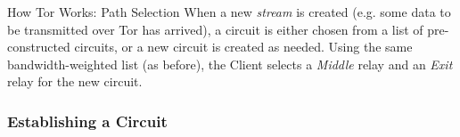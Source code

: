 \documentclass[9pt,a4paper,handout]{beamer}
\begin{document}
\begin{frame}{How Tor Works: Path Selection}
  When a new \emph{stream} is created (e.g. some data to be transmitted over Tor has arrived), a
  circuit is either chosen from a list of pre-constructed circuits, or a new circuit is created as
  needed. Using the same bandwidth-weighted list (as before), the Client selects a \emph{Middle}
  relay and an \emph{Exit} relay for the new circuit.
\end{frame}


\begin{frame}
  \frametitle{Establishing a Circuit}
\end{frame}
\end{document}
